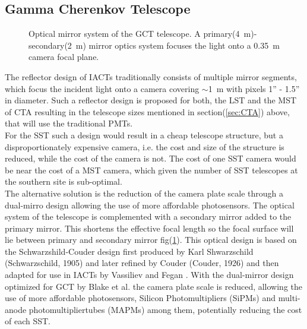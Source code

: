 \documentclass[12pt,article,type=msc,colorback,accentcolor=tud9c]{tudthesis}
\begin{document}
\subsection{Gamma Cherenkov Telescope}
\begin{figure}[b!]
\begin{centering}
\caption[GCT optical system]{Optical mirror system of the GCT telescope. A primary(4~m)-secondary(2~m) mirror optics system focuses the light onto a 0.35~m camera focal plane.}
\label{fig:GCT_Focal}
\end{centering}
\end{figure}
The reflector design of IACTs traditionally consists of multiple mirror segments, which focus the incident light onto a camera covering $\sim$1~m with pixels 1'' - 1.5'' in diameter. Such a reflector design is proposed for both, the LST and the MST of CTA resulting in the telescope sizes mentioned in section(\ref{sec:CTA}) above, that will use the traditional PMTs.\\
For the SST such a design would result in a cheap telescope structure, but a disproportionately expensive camera, i.e. the cost and size of the structure is reduced, while the cost of the camera is not. The cost of one SST camera would be near the cost of a MST camera, which given the number of SST telescopes at the southern site is sub-optimal.\\
The alternative solution is the reduction of the camera plate scale through a dual-mirro design allowing the use of more affordable photosensors. The optical system of the telescope is complemented with a secondary mirror added to the primary mirror. This shortens the effective focal length so the focal surface will lie between primary and secondary mirror fig(\ref{fig:GCT_Focal}). This optical design is based on the Schwarzshild-Couder design first produced by Karl Shwarzschild (Schwarzschild, 1905) and later refined by Couder (Couder, 1926) and then adapted for use in IACTs by Vassiliev and Fegan \cite{FeganVassiliev}. With the dual-mirror design optimized for GCT by Blake et al. \cite{SSTGATE} the camera plate scale is reduced, allowing the use of more affordable photosensors, Silicon Photomultipliers (SiPMs) and multi-anode photomultipliertubes (MAPMs) among them, potentially reducing the cost of each SST.
\end{document}
